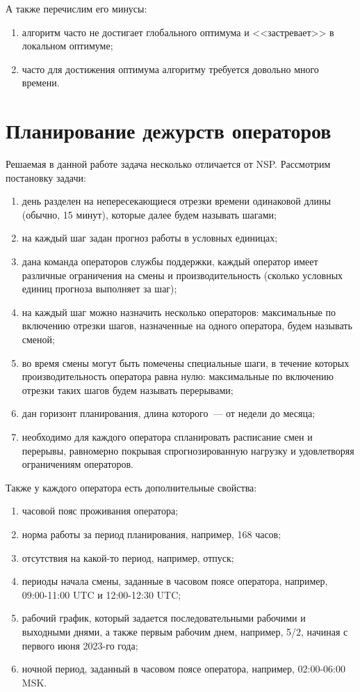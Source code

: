 \documentclass[times,specification,annotation]{itmo-student-thesis}
\begin{document}
А также перечислим его минусы:

\begin{enumerate}
    \item алгоритм часто не достигает глобального оптимума и <<застревает>> в локальном оптимуме;
    \item часто для достижения оптимума алгоритму требуется довольно много времени.
\end{enumerate}

\finishrelatedwork

\section{Планирование дежурств операторов}

Решаемая в данной работе задача несколько отличается от NSP.
Рассмотрим постановку задачи:

\begin{enumerate}
    \item день разделен на непересекающиеся отрезки времени одинаковой длины (обычно, 15 минут), которые далее будем называть шагами;
    \item на каждый шаг задан прогноз работы в условных единицах;
    \item дана команда операторов службы поддержки, каждый оператор имеет различные ограничения на смены и производительность (сколько условных единиц прогноза выполняет за шаг);
    \item на каждый шаг можно назначить несколько операторов: максимальные по включению отрезки шагов, назначенные на одного оператора, будем называть сменой;
    \item во время смены могут быть помечены специальные шаги, в течение которых производительность оператора равна нулю: максимальные по включению отрезки таких шагов будем называть перерывами;
    \item дан горизонт планирования, длина которого~--- от недели до месяца;
    \item необходимо для каждого оператора спланировать расписание смен и перерывы, равномерно покрывая спрогнозированную нагрузку и удовлетворяя ограничениям операторов.
\end{enumerate}

Также у каждого оператора есть дополнительные свойства:

\begin{enumerate}
    \item часовой пояс проживания оператора;
    \item норма работы за период планирования, например, 168 часов;
    \item отсутствия на какой-то период, например, отпуск;
    \item периоды начала смены, заданные в часовом поясе оператора, например, 09:00-11:00 UTC и 12:00-12:30 UTC;
    \item рабочий график, который задается последовательными рабочими и выходными днями, а также первым рабочим днем, например, 5/2, начиная с первого июня 2023-го года;
    \item ночной период, заданный в часовом поясе оператора, например, 02:00-06:00 MSK.
\end{enumerate}
\end{document}
